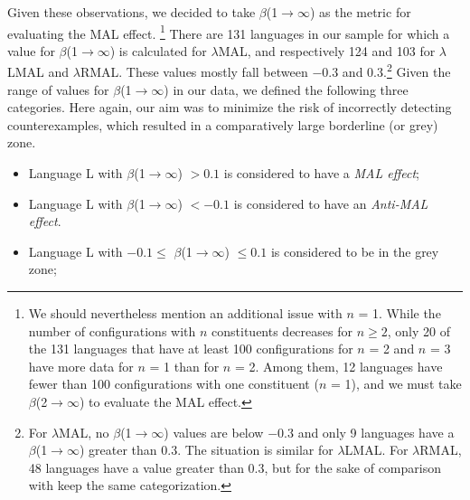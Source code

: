 
Given these observations, we decided to take $\beta$(1$\rightarrow\infty$) as the metric for evaluating the MAL effect.%
\footnote{We should nevertheless mention an additional issue with $n$ = 1. While the number of configurations with $n$ constituents decreases for $n \geq 2$, only 20 of the 131 languages that have at least 100 configurations for $n$ = 2 and $n$ = 3 have more data for $n$ = 1 than for $n$ = 2. Among them, 12 languages have fewer than 100 configurations with one constituent ($n$ = 1), and we must take $\beta$(2$\rightarrow\infty$) to evaluate the MAL effect.}
There are 131 languages in our sample for which a value for $\beta$(1$\rightarrow\infty$) is calculated for $\lambda$MAL, and respectively 124 and 103 for $\lambda$LMAL and $\lambda$RMAL. 
These values mostly fall between $-0.3$ and $0.3$.\footnote{For $\lambda$MAL, no $\beta$(1$\rightarrow\infty$) values are below $-0.3$ and only 9 languages have a $\beta$(1$\rightarrow\infty$) greater than $0.3$. The situation is similar for $\lambda$LMAL. For $\lambda$RMAL, 48 languages have a value greater than $0.3$, but for the sake of comparison with keep the same categorization.} Given the range of values for $\beta$(1$\rightarrow\infty$) in our data, we defined the following three categories. Here again, our aim was to minimize the risk of incorrectly detecting counterexamples, which resulted in a comparatively large borderline (or grey) zone. 


\begin{itemize}
    \item Language L with $\beta$(1$\rightarrow\infty$) $> 0.1$ is considered to have a \textit{MAL effect};
    \item Language L with $\beta$(1$\rightarrow\infty$) $< -0.1$ is considered to have an \textit{Anti-MAL effect}.
    \item Language L with $-0.1\leq$ $\beta$(1$\rightarrow\infty$) $\leq 0.1$ is considered to be in the grey zone;
\end{itemize}

